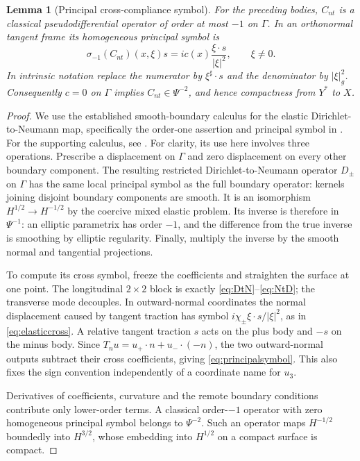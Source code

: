\documentclass[11pt,a4paper]{article}
\newtheorem{lemma}[theorem]{Lemma}
\theoremstyle{definition}\newtheorem{definition}[theorem]{Definition}
\theoremstyle{remark}\newtheorem{remark}[theorem]{Remark}
\numberwithin{equation}{section}
\begin{document}
\begin{lemma}[Principal cross-compliance symbol]\label{lem:principalcross}
For the preceding bodies, $C_{nt}$ is a classical pseudodifferential operator of order at most $-1$ on $\Gamma$. In an orthonormal tangent frame its homogeneous principal symbol is
\begin{equation}\label{eq:principalsymbol}
 \sigma_{-1}(C_{nt})(x,\xi)s
       =i c(x)\frac{\xi\cdot s}{|\xi|^2},\qquad\xi\ne0.
\end{equation}
In intrinsic notation replace the numerator by $\xi^\sharp\cdot s$ and the denominator by $|\xi|_g^2$. Consequently $c=0$ on $\Gamma$ implies $C_{nt}\in\Psi^{-2}$, and hence compactness from $Y^*$ to $X$.
\end{lemma}
\begin{proof}
We use the established smooth-boundary calculus for the elastic Dirichlet-to-Neumann map, specifically the order-one assertion and principal symbol in \cite[Theorem 1.1]{TanLiu}. For the supporting calculus, see \cite[Section 3, properties (Alg), (Supp), (Sob), (Symb), and the parametrix construction, pp. 7--9]{Dyatlov}. For clarity, its use here involves three operations. Prescribe a displacement on $\Gamma$ and zero displacement on every other boundary component. The resulting restricted Dirichlet-to-Neumann operator $D_\pm$ on $\Gamma$ has the same local principal symbol as the full boundary operator: kernels joining disjoint boundary components are smooth. It is an isomorphism $H^{1/2}\to H^{-1/2}$ by the coercive mixed elastic problem. Its inverse is therefore in $\Psi^{-1}$: an elliptic parametrix has order $-1$, and the difference from the true inverse is smoothing by elliptic regularity. Finally, multiply the inverse by the smooth normal and tangential projections.

To compute its cross symbol, freeze the coefficients and straighten the surface at one point. The longitudinal $2\times2$ block is exactly \eqref{eq:DtN}--\eqref{eq:NtD}; the transverse mode decouples. In outward-normal coordinates the normal displacement caused by tangent traction has symbol $i\chi_\pm\xi\cdot s/|\xi|^2$, as in \eqref{eq:elasticcross}. A relative tangent traction $s$ acts on the plus body and $-s$ on the minus body. Since $T_nu=u_+\cdot n+u_-\cdot(-n)$, the two outward-normal outputs subtract their cross coefficients, giving \eqref{eq:principalsymbol}. This also fixes the sign convention independently of a coordinate name for $u_3$.

Derivatives of coefficients, curvature and the remote boundary conditions contribute only lower-order terms. A classical order-$-1$ operator with zero homogeneous principal symbol belongs to $\Psi^{-2}$. Such an operator maps $H^{-1/2}$ boundedly into $H^{3/2}$, whose embedding into $H^{1/2}$ on a compact surface is compact.
\end{proof}
\end{document}
